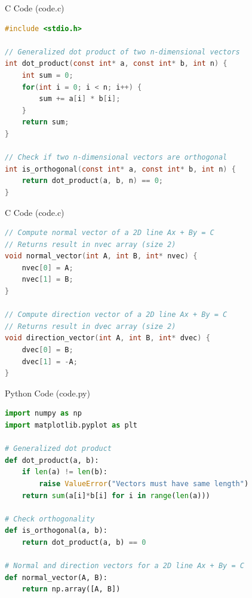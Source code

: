 \documentclass{beamer}
\begin{document}
\begin{frame}[fragile]{C Code (code.c)}
\begin{lstlisting}[language=C]
#include <stdio.h>

// Generalized dot product of two n-dimensional vectors
int dot_product(const int* a, const int* b, int n) {
    int sum = 0;
    for(int i = 0; i < n; i++) {
        sum += a[i] * b[i];
    }
    return sum;
}

// Check if two n-dimensional vectors are orthogonal
int is_orthogonal(const int* a, const int* b, int n) {
    return dot_product(a, b, n) == 0;
}

\end{lstlisting}
\end{frame}
\begin{frame}[fragile]{C Code (code.c)}
\begin{lstlisting}[language=C]
// Compute normal vector of a 2D line Ax + By = C
// Returns result in nvec array (size 2)
void normal_vector(int A, int B, int* nvec) {
    nvec[0] = A;
    nvec[1] = B;
}

// Compute direction vector of a 2D line Ax + By = C
// Returns result in dvec array (size 2)
void direction_vector(int A, int B, int* dvec) {
    dvec[0] = B;
    dvec[1] = -A;
}
\end{lstlisting}
\end{frame}
\begin{frame}[fragile]{Python Code (code.py)}
\begin{lstlisting}[language=Python]
import numpy as np
import matplotlib.pyplot as plt

# Generalized dot product
def dot_product(a, b):
    if len(a) != len(b):
        raise ValueError("Vectors must have same length")
    return sum(a[i]*b[i] for i in range(len(a)))

# Check orthogonality
def is_orthogonal(a, b):
    return dot_product(a, b) == 0

# Normal and direction vectors for a 2D line Ax + By = C
def normal_vector(A, B):
    return np.array([A, B])
\end{lstlisting}
\end{frame}
\end{document}
